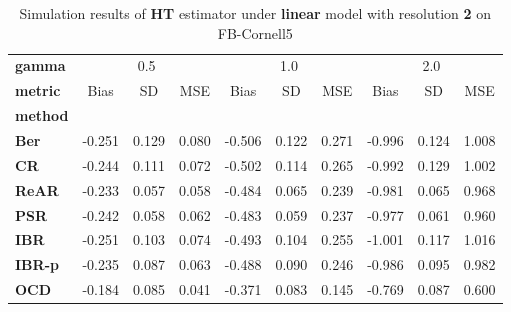 \begin{table}
\centering
\caption{Simulation results of \textbf{HT} estimator under \textbf{linear} model with resolution \textbf{2} on FB-Cornell5}
\begin{tabular}{lccccccccc}
\toprule
\textbf{gamma} & \multicolumn{3}{c}{0.5} & \multicolumn{3}{c}{1.0} & \multicolumn{3}{c}{2.0} \\
\textbf{metric} &   Bias &     SD &    MSE &   Bias &     SD &    MSE &   Bias &     SD &    MSE \\
\textbf{method} &        &        &        &        &        &        &        &        &        \\
\midrule
\textbf{Ber} & -0.251 &  0.129 &  0.080 & -0.506 &  0.122 &  0.271 & -0.996 &  0.124 &  1.008 \\
\textbf{CR} & -0.244 &  0.111 &  0.072 & -0.502 &  0.114 &  0.265 & -0.992 &  0.129 &  1.002 \\
\textbf{ReAR} & -0.233 &  0.057 &  0.058 & -0.484 &  0.065 &  0.239 & -0.981 &  0.065 &  0.968 \\
\textbf{PSR} & -0.242 &  0.058 &  0.062 & -0.483 &  0.059 &  0.237 & -0.977 &  0.061 &  0.960 \\
\textbf{IBR} & -0.251 &  0.103 &  0.074 & -0.493 &  0.104 &  0.255 & -1.001 &  0.117 &  1.016 \\
\textbf{IBR-p} & -0.235 &  0.087 &  0.063 & -0.488 &  0.090 &  0.246 & -0.986 &  0.095 &  0.982 \\
\textbf{OCD} & -0.184 &  0.085 &  0.041 & -0.371 &  0.083 &  0.145 & -0.769 &  0.087 &  0.600 \\
\bottomrule
\end{tabular}
\end{table}
